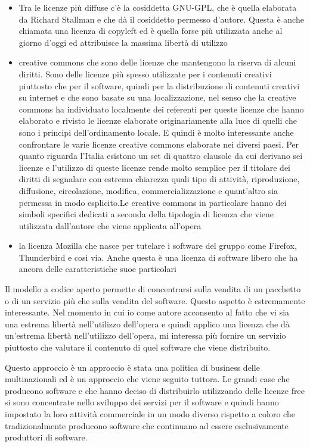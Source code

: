 \begin{itemize}
    \item Tra le licenze più diffuse c'è la cosiddetta GNU-GPL, che è quella elaborata da Richard Stallman e che dà il cosiddetto permesso d'autore. Questa è anche chiamata una licenza di copyleft ed è quella forse più utilizzata anche al giorno d'oggi ed attribuisce la massima libertà di utilizzo
    \item creative commons che sono delle licenze che mantengono la riserva di alcuni diritti. Sono delle licenze più spesso utilizzate per i contenuti creativi piuttosto che per il software, quindi per la distribuzione di contenuti creativi su internet e che sono basate su una localizzazione, nel senso che la creative commons ha individuato localmente dei referenti per queste licenze che hanno elaborato e rivisto le licenze elaborate originariamente alla luce di quelli che sono i principi dell'ordinamento locale. E quindi è molto interessante anche confrontare le varie licenze creative commons elaborate nei diversi paesi. Per quanto riguarda l'Italia esistono un set di quattro clausole da cui derivano sei licenze e l'utilizzo di queste licenze rende molto semplice per il titolare dei diritti di segnalare con estrema chiarezza quali tipo di attività, riproduzione, diffusione, circolazione, modifica, commercializzazione e quant'altro sia permessa in modo esplicito.Le creative commons in particolare hanno dei simboli specifici dedicati a seconda della tipologia di licenza che viene utilizzata dall'autore che viene applicata all'opera
    \item la licenza Mozilla che nasce per tutelare i software del gruppo come Firefox, Thunderbird e così via. Anche questa è una licenza di software libero che ha ancora delle caratteristiche suoe particolari
\end{itemize}


Il modello a codice aperto permette di concentrarsi sulla vendita di un pacchetto o di un servizio più che sulla vendita del software. Questo aspetto è estremamente interessante. Nel momento in cui io come autore acconsento al fatto che vi sia una estrema libertà nell'utilizzo dell'opera e quindi applico una licenza che dà un'estrema libertà nell'utilizzo dell'opera, mi interessa più fornire un servizio piuttosto che valutare il contenuto di quel software che viene distribuito. 

Questo approccio è un approccio è stata una politica di business delle multinazionali ed è un approccio che viene seguito tuttora. Le grandi case che producono software e che hanno deciso di distribuirlo utilizzando delle licenze free si sono concentrate nello sviluppo dei servizi per il software e quindi hanno impostato la loro attività commerciale in un modo diverso rispetto a coloro che tradizionalmente producono software che continuano ad essere esclusivamente produttori di software. 

